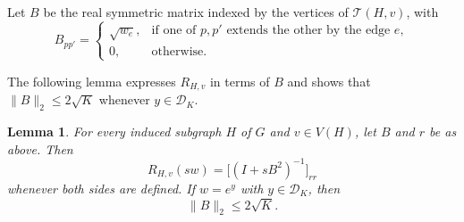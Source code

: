 \documentclass[11pt,reqno,letterpaper]{amsart}
\numberwithin{equation}{section}
\newtheorem{lemma}[lemma]{Lemma}
\theoremstyle{definition}
\theoremstyle{remark}
\newcommand{\cD}{\mathcal D}
\newcommand{\norm}[1]{\lVert #1\rVert}
\begin{document}
Let $B$ be the real symmetric matrix indexed by the vertices of
$\mathcal T(H,v)$, with
\[
 B_{pp'}=
 \begin{cases}
  \sqrt{w_e},&\text{if one of $p,p'$ extends the other by the edge $e$},\\
  0,&\text{otherwise}.
 \end{cases}
\]

The following lemma expresses $R_{H,v}$ in terms of $B$ and shows
that $\norm B_2\le2\sqrt K$ whenever $y\in\cD_K$.

\begin{lemma}\label{lem:path-tree-resolvent}
For every induced subgraph $H$ of $G$ and $v\in V(H)$, let $B$ and
$r$ be as above. Then
\begin{equation}\label{eq:path-tree-resolvent}
 R_{H,v}(sw)=\bigl[(I+sB^2)^{-1}\bigr]_{rr}
\end{equation}
whenever both sides are defined. If $w=e^y$ with $y\in\cD_K$, then
\begin{equation*}
 \norm{B}_2\le2\sqrt K.
\end{equation*}
\end{lemma}
\end{document}
